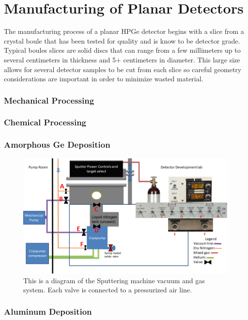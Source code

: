 \chapter{Manufacturing of Planar Detectors}
The manufacturing process of a planar HPGe detector begins with a slice from a crystal boule that has been tested for quality and is know to be detector grade. Typical boules slices are solid discs that can range from a few millimeters up to several centimeters in thickness and 5+ centimeters in diameter. This large size allows for several detector samples to be cut from each slice so careful geometry considerations are important in order to minimize wasted material.


\subsection{Mechanical Processing}

\subsection{Chemical Processing}

\subsection{Amorphous Ge Deposition}

\begin{figure}
\includegraphics[width=\textwidth]{figures/sput-flow}
\caption{This is a diagram of the Sputtering machine vacuum and gas system. Each valve is connected to a pressurized air line.}
\label{LandscapeFigure}
\end{figure}

\subsection{Aluminum Deposition}

